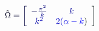 \documentclass[12pt]{article}
\begin{document}
\makeatletter
\renewcommand*{\@textcolor}[3]{%
  \protect\leavevmode
  \begingroup
    \color#1{#2}#3%
  \endgroup
}
\makeatother
\begin{displaymath}
\mathcolor[RGB]{0,0,15}{\tilde { \mathcolor[RGB]{0,0,30}{\Omega} } } \mathcolor[RGB]{0,0,45}{=} \mathcolor[RGB]{0,0,60}{\left[} \begin{array} {cc} { \mathcolor[RGB]{0,0,75}{-} \mathcolor[RGB]{0,0,90}{\frac { \mathcolor[RGB]{0,0,105}{\pi} ^ { \mathcolor[RGB]{0,0,120}{2} } } { \mathcolor[RGB]{0,0,135}{k} } } } & { \mathcolor[RGB]{0,0,150}{k} } \\ { \mathcolor[RGB]{0,0,165}{k} ^ { \mathcolor[RGB]{0,0,180}{2} } } & { \mathcolor[RGB]{0,0,195}{2} \mathcolor[RGB]{0,0,210}{(} \mathcolor[RGB]{0,0,225}{\alpha} \mathcolor[RGB]{0,0,240}{-} \mathcolor[RGB]{0,0,255}{k} \mathcolor[RGB]{0,15,0}{)} } \end{array} \mathcolor[RGB]{0,15,15}{\right]}
\end{displaymath}
\end{document}
